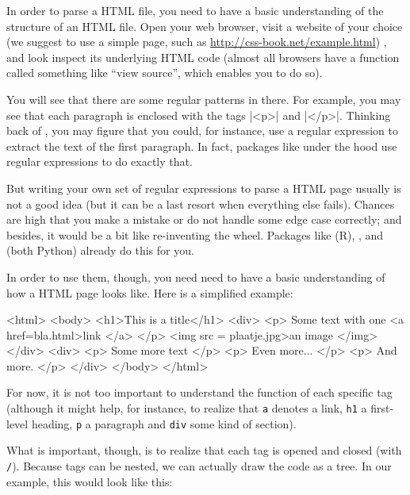 In order to parse a HTML file, you need to have a basic understanding
of the structure of an HTML file. Open your web browser, visit a
website of your choice (we suggest to use a simple page, such as
\url{http://css-book.net/example.html}) , and
look inspect its underlying HTML code (almost all browsers have a
function called something like ``view source'', which enables you to
do so).

You will see that there are some regular patterns in there. For
example, you may see that each paragraph is enclosed with the tags
|<p>| and |</p>|. Thinking back of , you may figure
that you could, for instance, use a regular expression to extract
the text of the first paragraph. In fact, packages like 
under the hood use regular expressions to do exactly that.

But writing your own set of regular expressions to parse a HTML
page usually is not a good idea (but it can be a last resort when
everything else fails). Chances are high that you make
a mistake or do not handle some edge case correctly; and besides,
it would be a bit like re-inventing the wheel. Packages like
 (R), , and  (both Python)
already do this for you.

In order to use them, though, you need need to have a basic
understanding of how a HTML page looks like. Here is a simplified
example:

\begin{lstlistingoutput}
<html>
<body>
<h1>This is a title</h1>
<div>
<p> Some text with one <a href=bla.html>link </a> </p>
<img src = plaatje.jpg>an image </img>
</div>
<div>
<p> Some more text </p>
<p> Even more... </p>
<p> And more. </p>
</div>
</body>
</html>
\end{lstlistingoutput}

For now, it is not too important to understand the function of each
specific tag (although it might help, for instance, to realize that
\texttt{a} denotes a link, \texttt{h1} a first-level heading,
\texttt{p} a paragraph and \texttt{div} some kind of section).

What is important, though, is to realize that each tag is opened and
closed (with \texttt{/}). Because tags can be nested, we can actually
draw the code as a tree. In our example, this would look like this:




